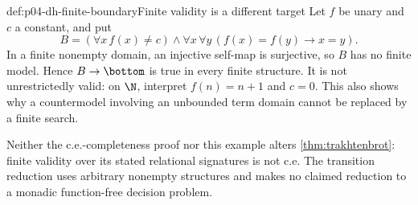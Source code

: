 \begin{hbexample}{def:p04-dh-finite-boundary}{Finite validity is a different target}
Let \(f\) be unary and \(c\) a constant, and put
\[
 B=(\forall x\,f(x)\ne c)\land
     \forall x\,\forall y\,(f(x)=f(y)\to x=y).
\]
In a finite nonempty domain, an injective self-map is surjective, so
\(B\) has no finite model. Hence \(B\to\bottom\) is true in every finite
structure. It is not unrestrictedly valid: on \(\N\), interpret
\(f(n)=n+1\) and \(c=0\). This also shows why a countermodel involving
an unbounded term domain cannot be replaced by a finite search.

Neither the c.e.-completeness proof nor this example alters
\cref{thm:trakhtenbrot}: finite validity over its stated relational
signatures is not c.e. The transition reduction uses arbitrary nonempty
structures and makes no claimed reduction to a monadic function-free
decision problem.
\end{hbexample}

